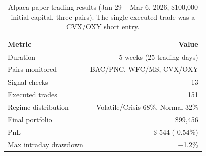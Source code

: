 \begin{table}[t]
\centering
\caption{Alpaca paper trading results (Jan 29 -- Mar 6, 2026, \$100{,}000 initial capital, three pairs).
The single executed trade was a CVX/OXY short entry.}
\label{tab:paper_trading_detail}
\small
\begin{tabular}{lr}
\toprule
Metric & Value \\
\midrule
Duration & 5 weeks (25 trading days) \\
Pairs monitored & BAC/PNC, WFC/MS, CVX/OXY \\
Signal checks & 13 \\
Executed trades & 151 \\
Regime distribution & Volatile/Crisis 68\%, Normal 32\% \\
Final portfolio & \$99,456 \\
PnL & \$-544 (-0.54\%) \\
Max intraday drawdown & $-$1.2\% \\
\bottomrule
\end{tabular}
\end{table}
